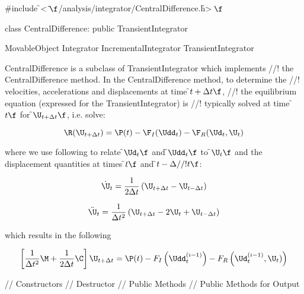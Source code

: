 
\indent \#include \f$<\tilde{ }\f$/analysis/integrator/CentralDifference.h\f$>\f$

\indent class CentralDifference: public TransientIntegrator

\indent MovableObject
\indent\indent Integrator
\indent\indent\indent IncrementalIntegrator
\indent\indent\indent\indent TransientIntegrator
\indent\indent\indent\indent{}

\indent CentralDifference is a subclass of TransientIntegrator which implements
//! the CentralDifference method. In the CentralDifference method, to determine the
//! velocities, accelerations and displacements at time \f$t + \Delta t\f$,
//! the equilibrium equation (expressed for the TransientIntegrator) is
//! typically solved at time \f$t\f$ for \f$\U_{t+\Delta t}\f$, i.e. solve: 

\[ \R (\U_{t+ \Delta t}) = \P(t) - \F_I(\Udd_{t})
- \F_R(\Ud_{t},\U_{t}) \]

\noindent where we use following to relate \f$\Ud_{t}\f$ and \f$\Udd_{t}\f$ to
\f$\U_{t}\f$ and the displacement quantities at times \f$t\f$ and \f$t - \Delta
//! t\f$: 

\[
\dot \U_{t} = \frac{1}{2 \Delta t} \left(
\U_{t + \Delta t} -  \U_{t - \Delta t} \right)
\]

\[
\ddot \U_{t} = \frac{1}{\Delta t^2} \left(
\U_{t + \Delta t} - 2 \U_t + \U_{t - \Delta t}\right)
\]


\noindent which results in the following 

\[ \left[ \frac{1}{\Delta t^2} \M + \frac{1}{2 \Delta t}
\C \right] \U_{t + \Delta t} = \P(t) - F_I \left(\Udd_t^{(i-1)}
\right)
-F_R\left( \Ud_t^{(i-1)}, \U_t)\right) \]


\indent\indent // Constructors
\indent{} 
\indent{}
\indent\indent // Destructor
\indent{}
\indent\indent // Public Methods
\indent{}
\indent{}
\indent{}
\indent{}
\indent{}
\indent\indent // Public Methods for Output
\indent{} 
\indent{} 
\indent{}


